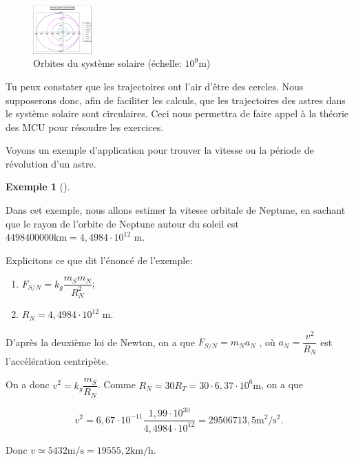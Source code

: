 \documentclass[
  letterpaper,
  DIV=11,
  numbers=noendperiod]{scrartcl}
\providecommand{\tightlist}{%
  \setlength{\itemsep}{0pt}\setlength{\parskip}{0pt}}\usepackage{longtable,booktabs,array}
\theoremstyle{definition}
\theoremstyle{definition}
\theoremstyle{definition}
\newtheorem{example}{Exemple}[section]
\theoremstyle{remark}
\begin{document}
\begin{figure}[H]

{\centering \includegraphics[width=0.2\textwidth,height=\textheight]{figures/grav/orbites.pdf}

}

\caption{Orbites du système solaire (échelle: \(10^9\)m)}

\end{figure}%

Tu peux constater que les trajectoires ont l'air d'être des cercles.
Nous supposerons donc, afin de faciliter les calculs, que les
trajectoires des astres dans le système solaire sont circulaires. Ceci
nous permettra de faire appel à la théorie des MCU pour résoudre les
exercices.

Voyons un exemple d'application pour trouver la vitesse ou la période de
révolution d'un astre.

\begin{example}[]\protect\hypertarget{exm-netpune}{}\label{exm-netpune}

Dans cet exemple, nous allons estimer la vitesse orbitale de Neptune, en
sachant que le rayon de l'orbite de Neptune autour du soleil est
\(4 498 400 000 \text{km}=4,4984\cdot 10^{12}\) m.

Explicitons ce que dit l'énoncé de l'exemple:

\begin{enumerate}
\def\labelenumi{\arabic{enumi}.}
\tightlist
\item
  \(F_{S/N}=k_g\dfrac{m_Sm_N}{R_N^2}\);
\item
  \(R_N=4,4984\cdot 10^{12}\) m.
\end{enumerate}

D'après la deuxième loi de Newton, on a que \(F_{S/N}=m_Na_N\) , où
\(a_N=\dfrac{v^2}{R_N}\) est l'accélération centripète.

On a donc \(v^2=k_g\dfrac{m_S}{R_N}\). Comme
\(R_N=30 R_T=30\cdot 6,37\cdot 10^6\text{m}\), on a que

\[
v^2=6,67\cdot 10^{-11}\dfrac{1,99\cdot 10^{30}}{4,4984\cdot 10^{12}}=29506713,5 \text{m}^2/\text{s}^2.
\]

Donc \(v\simeq 5432\text{m/s}=19555,2\text{km/h}\).

\end{example}
\end{document}
